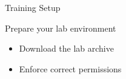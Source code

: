 \setuplabframe
{Training Setup}
{
  Prepare your lab environment
  \begin{itemize}
  \item Download the lab archive
  \item Enforce correct permissions
  \end{itemize}
}
